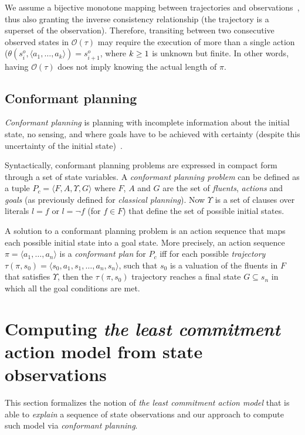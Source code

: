 \documentclass{article}
\newcommand{\tup}[1]{{\langle #1 \rangle}}
\begin{document}
We assume a bijective monotone mapping between trajectories and observations~\cite{ramirez2009plan}, thus also granting the inverse consistency relationship (the trajectory is a superset of the observation). Therefore, transiting between two consecutive observed states in $\mathcal{O}(\tau)$ may require the execution of more than a single action ($\theta(s_i^o,\tup{a_1,\ldots,a_k})=s_{i+1}^o$, where ${\small k\geq 1}$ is unknown but finite. In other words, having $\mathcal{O}(\tau)$ does not imply knowing the actual length of $\pi$.

\subsection{Conformant planning}
{\em Conformant planning} is planning with incomplete information about the initial state, no sensing, and where goals have to be achieved with certainty (despite this uncertainty of the initial state)~\cite{smith1998conformant,goldman1996expressive}.

Syntactically, conformant planning problems are expressed in compact form through a set of state variables. A {\em conformant planning problem} can be defined as a tuple $P_c=\tup{F,A,\Upsilon,G}$ where $F$, $A$ and $G$ are the set of {\em fluents}, {\em actions} and {\em goals} (as previously defined for {\em classical planning}). Now $\Upsilon$ is a set of clauses over literals $l=f$ or $l=\neg f$ (for $f\in F$) that define the set of possible initial states. 

A solution to a conformant planning problem is an action sequence that maps each possible initial state into a goal state. More precisely, an action sequence $\pi=\tup{a_1, \ldots, a_n}$ is a {\em conformant plan} for $P_c$ iff for each possible {\em trajectory} $\tau(\pi,s_0)=\tup{s_0, a_1, s_1, \ldots, a_n, s_n}$, such that $s_0$ is a valuation of the fluents in $F$ that satisfies $\Upsilon$, then the $\tau(\pi,s_0)$ trajectory reaches a final state $G \subseteq s_n$ in which all the goal conditions are met.



\section{Computing {\em the least commitment} action model from state observations}
This section formalizes the notion of {\em the least commitment action model} that is able to {\em explain} a sequence of state observations and our approach to compute such model via {\em conformant planning}. 
\end{document}
